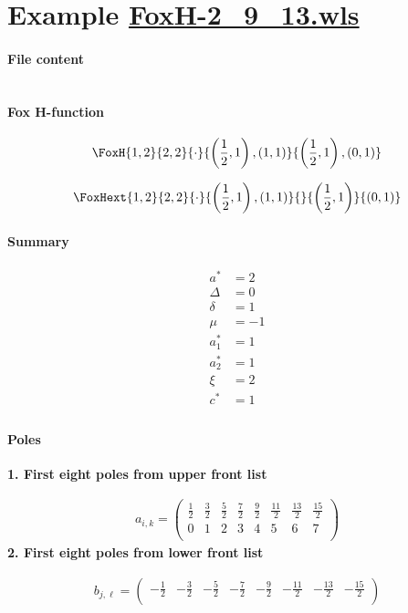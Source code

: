 \documentclass[11pt]{article}
\begin{document}
\section{Example \url{FoxH-2_9_13.wls}}

\paragraph{File content}

\inputminted{text}{FoxH-2_9_13.wls}

\paragraph{Fox H-function}

\begin{align*}
  \FoxH
    {1,2}
    {2,2}
    {\cdot}
    {\left(\frac{1}{2}, 1\right), \left(1, 1\right)}
    {\left(\frac{1}{2}, 1\right), \left(0, 1\right)}
\end{align*}

\begin{align*}
  \FoxHext
    {1,2}
    {2,2}
    {\cdot}
    {\left(\frac{1}{2}, 1\right), \left(1, 1\right)}
    {}
    {\left(\frac{1}{2}, 1\right)}
    {\left(0, 1\right)}
\end{align*}

\paragraph{Summary}

\begin{align*}
  a^*    & = 2 \\
  \Delta & = 0 \\
  \delta & = 1 \\
  \mu    & = -1 \\
  a_1^*  & = 1 \\
  a_2^*  & = 1 \\
  \xi    & = 2 \\
  c^*    & = 1 \\
\end{align*}

\paragraph{Poles}

\noindent\textbf{1. First eight poles from upper front list}

\begin{align*}
  a_{i,k} = 
  \left(
\begin{array}{cccccccc}
 \frac{1}{2} & \frac{3}{2} & \frac{5}{2} & \frac{7}{2} & \frac{9}{2} & \frac{11}{2} & \frac{13}{2} & \frac{15}{2} \\
 0 & 1 & 2 & 3 & 4 & 5 & 6 & 7 \\
\end{array}
\right)
\end{align*}
\noindent\textbf{2. First eight poles from lower front list}

\begin{align*}
  b_{j,\ell} = 
  \left(
\begin{array}{cccccccc}
 -\frac{1}{2} & -\frac{3}{2} & -\frac{5}{2} & -\frac{7}{2} & -\frac{9}{2} & -\frac{11}{2} & -\frac{13}{2} & -\frac{15}{2} \\
\end{array}
\right)
\end{align*}

\printbibliography[title={References}]
\end{document}
